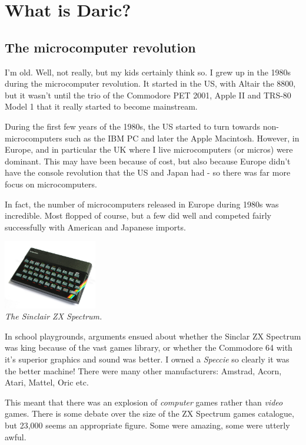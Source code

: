 \documentclass[10pt]{book}
\newcommand{\Daric}{Daric}
\begin{document}
\section{What is \Daric?}

\subsection{The microcomputer revolution}
\par{I'm old. Well, not really, but my kids certainly think so. I grew up in the 1980s during the microcomputer revolution. It started in the US, with Altair the 8800, but it wasn't until the trio of the Commodore PET 2001, Apple II and TRS-80 Model 1 that it really started to become mainstream.}
\par{During the first few years of the 1980s, the US started to turn towards non-microcomputers such as the IBM PC and later the Apple Macintosh. However, in Europe, and in particular the UK where I live microcomputers (or micros) were dominant. This may have been because of cost, but also because Europe didn't have the console revolution that the US and Japan had - so there was far more focus on microcomputers.}
\par{In fact, the number of microcomputers released in Europe during 1980s was incredible. Most flopped of course, but a few did well and competed fairly successfully with American and Japanese imports.}
\begin{center}
\includegraphics[height=3cm]{1200px-ZXSpectrum48k.jpg}\\
\scriptsize{\emph{The Sinclair ZX Spectrum.}}
\end{center}
\par{In school playgrounds, arguments ensued about whether the Sinclar ZX Spectrum was king because of the vast games library, or whether the Commodore 64 with it's superior graphics and sound was better. I owned a \emph{Speccie} so clearly it was the better machine! There were many other manufacturers: Amstrad, Acorn, Atari, Mattel, Oric etc.}
\par{This meant that there was an explosion of \emph{computer} games rather than \emph{video} games. There is some debate over the size of the ZX Spectrum games catalogue, but 23,000 seems an appropriate figure. Some were amazing, some were utterly awful.}
\end{document}
